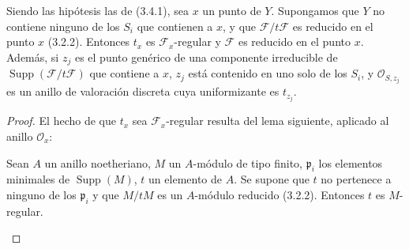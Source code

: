 \begin{proposition}[3.4.6]
\label{IV.2.3.4.6-fr}
Siendo las hipótesis las de \textup{(3.4.1)}, sea $x$ un punto de $Y$. Supongamos
que $Y$ no contiene ninguno de los $S_i$ que contienen a $x$, y que
$\mathcal F/t\mathcal F$ es reducido en el punto $x$ \textup{(3.2.2)}. Entonces $t_x$ es
$\mathcal F_x$-regular y $\mathcal F$ es reducido en el punto $x$. Además, si
$z_j$ es el punto genérico de una componente irreducible de
$\operatorname{Supp}(\mathcal F/t\mathcal F)$ que contiene a $x$, $z_j$ está
contenido en uno solo de los $S_i$, y $\mathcal O_{S,z_j}$ es un anillo de
valoración discreta cuya uniformizante es $t_{z_j}$.
\end{proposition}

\begin{proof}
El hecho de que $t_x$ sea $\mathcal F_x$-regular resulta del lema siguiente,
aplicado al anillo $\mathcal O_x$:

\begin{lemma}[3.4.6.1]
\label{IV.2.3.4.6.1-fr}
Sean $A$ un anillo noetheriano, $M$ un $A$-módulo de tipo finito,
$\mathfrak p_i$ los elementos minimales de $\operatorname{Supp}(M)$, $t$ un
elemento de $A$. Se supone que $t$ no pertenece a ninguno de los
$\mathfrak p_i$ y que $M/tM$ es un $A$-módulo reducido \textup{(3.2.2)}. Entonces $t$
es $M$-regular.
\end{lemma}


\end{proof}

